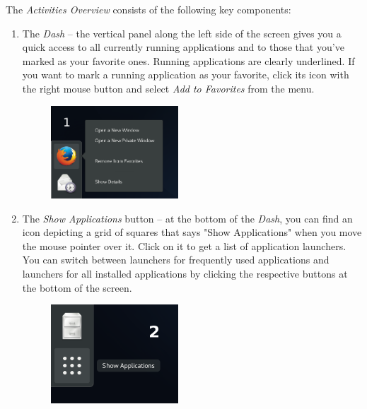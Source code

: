 The \emph{Activities Overview} consists of the following key components:
\begin{enumerate}
\item The \emph{Dash} -- the vertical panel along the left side of the screen gives you a quick access to all currently running applications and to those that you've marked as your favorite ones. Running applications are clearly underlined. If you want to mark a running application as your favorite, click its icon with the right mouse button and select \emph{Add to Favorites} from the menu.

\begin{figure}[ht]
\begin{center}
\includegraphics[width=0.45\textwidth]{img/dash-b}
 \label{fig:dash-b}
\end{center}
\end{figure}

\item The \emph{Show Applications} button -- at the bottom of the \emph{Dash}, you can find an icon depicting a grid of squares that says "Show Applications" when you move the mouse pointer over it. Click on it to get a list of application launchers. You can switch between launchers for frequently used applications and launchers for all installed applications by clicking the respective buttons at the bottom of the screen.

\begin{figure}[ht]
\begin{center}
\includegraphics[width=0.45\textwidth]{img/dash-a}
 \label{fig:dash-a}
\end{center}
\end{figure}


\end{enumerate}
